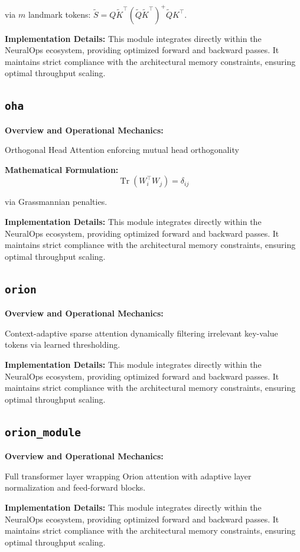 \documentclass[10pt,twocolumn,letterpaper]{article}
\begin{document}
via $m$ landmark tokens: $\tilde{S} = Q \tilde{K}^\top (\tilde{Q}\tilde{K}^\top)^+ \tilde{Q} K^\top$.

\textbf{Implementation Details:}
This module integrates directly within the NeuralOps ecosystem, providing optimized forward and backward passes. It maintains strict compliance with the architectural memory constraints, ensuring optimal throughput scaling.

\subsection{\texttt{oha}}
\textbf{Overview and Operational Mechanics:}

Orthogonal Head Attention enforcing mutual head orthogonality

\textbf{Mathematical Formulation:}
\begin{equation}
\operatorname{Tr}(W_i^\top W_j) = \delta_{ij}
\end{equation}

via Grassmannian penalties.

\textbf{Implementation Details:}
This module integrates directly within the NeuralOps ecosystem, providing optimized forward and backward passes. It maintains strict compliance with the architectural memory constraints, ensuring optimal throughput scaling.

\subsection{\texttt{orion}}
\textbf{Overview and Operational Mechanics:}

Context-adaptive sparse attention dynamically filtering irrelevant key-value tokens via learned thresholding.

\textbf{Implementation Details:}
This module integrates directly within the NeuralOps ecosystem, providing optimized forward and backward passes. It maintains strict compliance with the architectural memory constraints, ensuring optimal throughput scaling.

\subsection{\texttt{orion\_module}}
\textbf{Overview and Operational Mechanics:}

Full transformer layer wrapping Orion attention with adaptive layer normalization and feed-forward blocks.

\textbf{Implementation Details:}
This module integrates directly within the NeuralOps ecosystem, providing optimized forward and backward passes. It maintains strict compliance with the architectural memory constraints, ensuring optimal throughput scaling.
\end{document}
